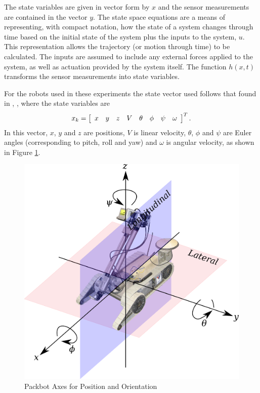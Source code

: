 The state variables are given in vector form by $x$ and the sensor measurements are contained in the vector $y$. The state space equations are a means of representing, with compact notation, how the state of a system changes through time based on the initial state of the system plus the inputs to the system, $u$. This representation allows the trajectory (or motion through time) to be calculated. The inputs are assumed to include any external forces applied to the system, as well as actuation provided by the system itself. The function $h(x,t)$ transforms the sensor measurements into state variables.

For the robots used in these experiments the state vector used follows that found in \cite{Kelly_1994_338}, \cite{Kelly_1994_333}, where the state variables are
\begin{align*}
x_k = \left[\begin{array}{c c c c c c c c} x & y & z & V & \theta & \phi & \psi & \omega \end{array}\right]^T.
\end{align*}
In this vector, $x$, $y$ and $z$ are positions, $V$ is linear velocity, $\theta$, $\phi$ and $\psi$ are Euler angles (corresponding to pitch, roll and yaw) and $\omega$ is angular velocity, as shown in Figure \ref{fig:packbotaxes}.

\begin{figure}[ht!]
    \centering
    \includegraphics[width=.8\textwidth]{images/packbotaxes}
    \caption{Packbot Axes for Position and Orientation}
    \label{fig:packbotaxes}
\end{figure}

